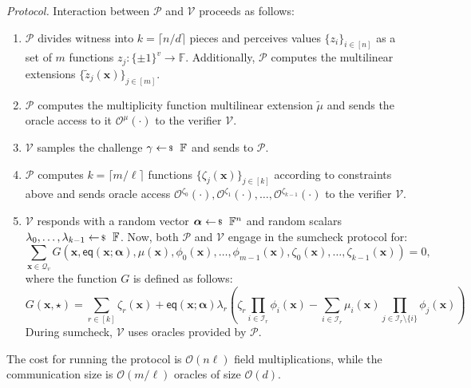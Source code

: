 \documentclass[../../book]{subfiles}
\begin{document}
\textit{Protocol.} Interaction between $\mathcal{P}$ and $\mathcal{V}$ proceeds as follows:
\begin{enumerate}
    \item $\mathcal{P}$ divides witness into $k = \lceil n/d \rceil$ pieces and
    perceives values $\{z_i\}_{i \in [n]}$ as a set of $m$ functions $z_j:
    \{\pm 1\}^v \to \mathbb{F}$. Additionally, $\mathcal{P}$ computes the
    multilinear extensions $\{\widetilde{z}_j(\mathbf{x})\}_{j \in [m]}$.
    \item $\mathcal{P}$ computes the multiplicity function multilinear extension
    $\widetilde{\mu}$ and sends the oracle access to it
    $\mathcal{O}^{\mu}(\cdot)$ to the verifier $\mathcal{V}$.
    \item $\mathcal{V}$ samples the challenge $\gamma \leftarrowS \mathbb{F}$
    and sends to $\mathcal{P}$.
    \item $\mathcal{P}$ computes $k=\lceil m/\ell \rceil$ functions
    $\{\zeta_j(\mathbf{x})\}_{j \in [k]}$ according to constraints above and
    sends oracle access
    $\mathcal{O}^{\zeta_0}(\cdot),\mathcal{O}^{\zeta_1}(\cdot),\dots,\mathcal{O}^{\zeta_{k-1}}(\cdot)$
    to the verifier $\mathcal{V}$.
    \item $\mathcal{V}$ responds with a random vector $\boldsymbol{\alpha} \leftarrowS \mathbb{F}^n$ and 
    random scalars $\lambda_0,\dots,\lambda_{k-1} \leftarrowS \mathbb{F}$. Now, both $\mathcal{P}$ and 
    $\mathcal{V}$ engage in the sumcheck protocol for:
    \begin{equation*}
        \sum_{\mathbf{x} \in \mathcal{Q}_v}G(\mathbf{x}, \mathsf{eq}(\mathbf{x};\boldsymbol{\alpha}),\mu(\mathbf{x}),\phi_0(\mathbf{x}),\dots,\phi_{m-1}(\mathbf{x}),\zeta_0(\mathbf{x}),\dots,\zeta_{k-1}(\mathbf{x})) = 0,
    \end{equation*}
    where the function $G$ is defined as follows:
    \begin{equation*}
        G(\mathbf{x},\star) = \sum_{r \in [k]} \zeta_r(\mathbf{x}) + \mathsf{eq}(\mathbf{x};\boldsymbol{\alpha})\lambda_r\left(\zeta_r\prod_{i \in \mathcal{I}_r}\phi_i(\mathbf{x}) - \sum_{i \in \mathcal{I}_r}\mu_i(\mathbf{x})\prod_{j \in \mathcal{I}_r \setminus \{i\}} \phi_j(\mathbf{x})\right)
    \end{equation*}
    During sumcheck, $\mathcal{V}$ uses oracles provided by $\mathcal{P}$.
\end{enumerate}

\begin{lemma}
    The cost for running the protocol is $\mathcal{O}(n \ell)$
    field multiplications, while the communication size is $\mathcal{O}(m/\ell)$ oracles of size
    $\mathcal{O}(d)$.
\end{lemma}
\end{document}

